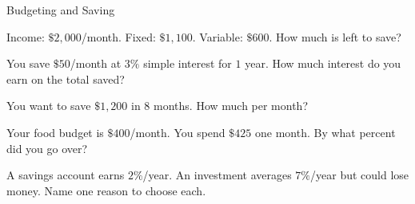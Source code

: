 \begin{practiceBox}{Budgeting and Saving}
\resetProblems

\prob Income: $\$2{,}000$/month. Fixed: $\$1{,}100$. Variable: $\$600$. How much is left to save?

\prob You save $\$50$/month at $3\%$ simple interest for $1$ year. How much interest do you earn on the total saved?

\prob You want to save $\$1{,}200$ in $8$ months. How much per month?

\prob Your food budget is $\$400$/month. You spend $\$425$ one month. By what percent did you go over?

\prob A savings account earns $2\%$/year. An investment averages $7\%$/year but could lose money. Name one reason to choose each.

\end{practiceBox}

